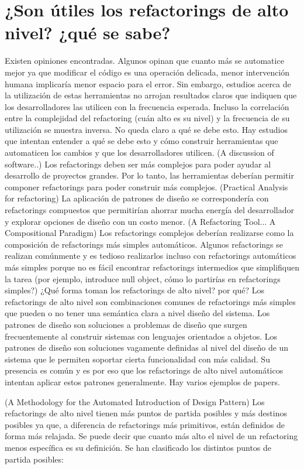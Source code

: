 \section{¿Son útiles los refactorings de alto nivel? ¿qué se sabe?}
Existen opiniones encontradas. Algunos opinan que cuanto más se automatice mejor ya que modificar el
código es una operación delicada, menor intervención humana implicaría menor espacio para el error.
Sin embargo, estudios acerca de la utilización de estas herramientas no arrojan resultados claros
que indiquen que los desarrolladores las utilicen con la frecuencia esperada. Incluso la correlación
entre la complejidad del refactoring (cuán alto es su nivel) y la frecuencia de su utilización se
muestra inversa. No queda claro a qué se debe esto. Hay estudios que intentan entender a qué se debe
esto y cómo construir herramientas que automaticen los cambios y que los desarrolladores utilicen.
(A discussion of software..) Los refactorings deben ser más complejos para poder ayudar al
desarrollo de proyectos grandes. Por lo tanto, las herramientas deberían permitir componer
refactorings para poder construir más complejos.
(Practical Analysis for refactoring) La aplicación de patrones de diseño se correspondería con
refactorings compuestos que permitirían ahorrar mucha energía del desarrollador y explorar opciones
de diseño con un costo menor.
(A Refactoring Tool... A Compositional Paradigm) Los refactorings complejos deberían realizarse como
la composición de refactorings más simples automáticos. Algunos refactorings se realizan comúnmente
y es tedioso realizarlos incluso con refactorings automáticos más simples porque no es fácil
encontrar refactorings intermedios que simplifiquen la tarea (por ejemplo, introduce null object,
cómo lo partirías en refactorings simples?)
¿Qué forma toman los refactorings de alto nivel? por qué? Los refactorings de alto nivel son
combinaciones comunes de refactorings más simples que pueden o no tener una semántica clara a nivel
diseño del sistema. Los patrones de diseño son soluciones a problemas de diseño que surgen
frecuentemente al construir sistemas con lenguajes orientados a objetos. Los patrones de diseño son
soluciones vagamente definidas al nivel del diseño de un sistema que le permiten soportar cierta
funcionalidad con más calidad. Su presencia es común y es por eso que los refactorings de alto nivel
automáticos intentan aplicar estos patrones generalmente. Hay varios ejemplos de papers.

(A Methodology for the Automated Introduction of Design Pattern) Los refactorings de alto nivel
tienen más puntos de partida posibles y más destinos posibles ya que, a diferencia de refactorings
más primitivos, están definidos de forma más relajada. Se puede decir que cuanto más alto el nivel
de un refactoring menos específica es su definición. Se han clasificado los distintos puntos de
partida posibles: 

